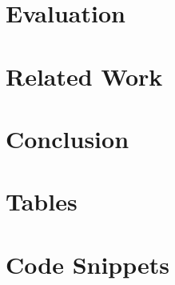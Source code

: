 \documentclass[11pt,a4paper]{book}
\begin{document}
\chapter{Evaluation}
\label{s:Evaluation}


\chapter{Related Work}
\label{s:Related Work}


\chapter{Conclusion}
\label{s:Conclusion}


\appendix
\chapter{Tables}
\label{appendix:tables}


\chapter{Code Snippets}
\label{appendix:code snippets}







\end{document}
